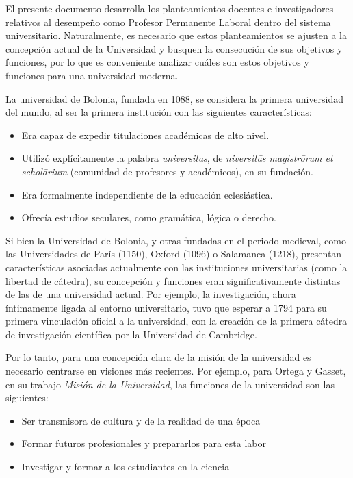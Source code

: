\documentclass[a4paper,12pt,twoside]{article}
\begin{document}
El presente documento desarrolla los planteamientos docentes e investigadores relativos al desempeño como Profesor Permanente Laboral dentro del sistema universitario. Naturalmente, es necesario que estos planteamientos se ajusten a la concepción actual de la Universidad y busquen la consecución de sus objetivos y funciones, por lo que es conveniente analizar cuáles son estos objetivos y funciones para una universidad moderna.

La universidad de Bolonia, fundada en 1088, se considera la primera universidad del mundo, al ser la primera institución con las siguientes características:

\begin{itemize}
\item Era capaz de expedir titulaciones académicas de alto nivel.
\item Utilizó explícitamente la palabra \textit{universitas}, de \textit{niversitās magistrōrum et scholārium} (comunidad de profesores y académicos), en su fundación.
\item Era formalmente independiente de la educación eclesiástica.
\item Ofrecía estudios seculares, como gramática, lógica o derecho.
\end{itemize}

Si bien la Universidad de Bolonia, y otras fundadas en el periodo medieval, como las Universidades de París (1150), Oxford (1096) o Salamanca (1218), presentan características asociadas actualmente con las instituciones universitarias (como la libertad de cátedra), su concepción y funciones eran significativamente distintas de las de una universidad actual. Por ejemplo, la investigación, ahora íntimamente ligada al entorno universitario, tuvo que esperar a 1794 para su primera vinculación oficial a la universidad, con la creación de la primera cátedra de investigación científica por la Universidad de Cambridge.

Por lo tanto, para una concepción clara de la misión de la universidad es necesario centrarse en visiones más recientes. Por ejemplo, para Ortega y Gasset, en su trabajo \textit{Misión de la Universidad}\cite{ortega_gasset}, las funciones de la universidad son las siguientes:

\begin{itemize}
\item Ser transmisora de cultura y de la realidad de una época
\item Formar futuros profesionales y prepararlos para esta labor
\item Investigar y formar a los estudiantes en la ciencia
\end{itemize}
\end{document}
